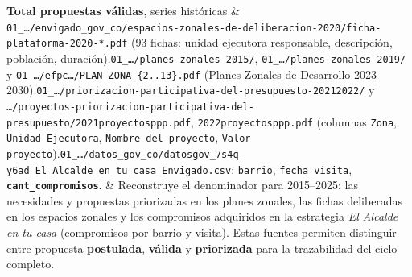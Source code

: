 \documentclass[11pt,a4paper]{article}
\begin{document}
{\begin{longtable}
\textbf{Total propuestas válidas}, series históricas & \texttt{01\_\allowbreak{}\ldots{}/\allowbreak{}envigado\_\allowbreak{}gov\_\allowbreak{}co/\allowbreak{}espacios-\allowbreak{}zonales-\allowbreak{}de-\allowbreak{}deliberacion-\allowbreak{}2020/\allowbreak{}ficha-\allowbreak{}plataforma-\allowbreak{}2020-\allowbreak{}*.\allowbreak{}pdf} (93 fichas: unidad ejecutora responsable, descripción, población, duración).\newline \texttt{01\_\allowbreak{}\ldots{}/\allowbreak{}planes-\allowbreak{}zonales-\allowbreak{}2015/\allowbreak{}}, \texttt{01\_\allowbreak{}\ldots{}/\allowbreak{}planes-\allowbreak{}zonales-\allowbreak{}2019/\allowbreak{}} y \texttt{01\_\allowbreak{}\ldots{}/\allowbreak{}efpc\ldots{}/\allowbreak{}PLAN-\allowbreak{}ZONA-\allowbreak{}\{2.\allowbreak{}.\allowbreak{}13\}.\allowbreak{}pdf} (Planes Zonales de Desarrollo 2023-2030).\newline \texttt{01\_\allowbreak{}\ldots{}/\allowbreak{}priorizacion-\allowbreak{}participativa-\allowbreak{}del-\allowbreak{}presupuesto-\allowbreak{}20212022/\allowbreak{}} y \texttt{\ldots{}/\allowbreak{}proyectos-\allowbreak{}priorizacion-\allowbreak{}participativa-\allowbreak{}del-\allowbreak{}presupuesto/\allowbreak{}2021proyectosppp.\allowbreak{}pdf}, \texttt{2022proyectosppp.\allowbreak{}pdf} (columnas \texttt{Zona}, \texttt{Unidad Ejecutora}, \texttt{Nombre del proyecto}, \texttt{Valor proyecto}).\newline \texttt{01\_\allowbreak{}\ldots{}/\allowbreak{}datos\_\allowbreak{}gov\_\allowbreak{}co/\allowbreak{}datosgov\_\allowbreak{}7s4q-\allowbreak{}y6ad\_\allowbreak{}El\_\allowbreak{}Alcalde\_\allowbreak{}en\_\allowbreak{}tu\_\allowbreak{}casa\_\allowbreak{}Envigado.\allowbreak{}csv}: \texttt{barrio}, \texttt{fecha\_\allowbreak{}visita}, \textbf{\texttt{cant\_\allowbreak{}compromisos}}. & Reconstruye el denominador para 2015–2025: las necesidades y propuestas priorizadas en los planes zonales, las fichas deliberadas en los espacios zonales y los compromisos adquiridos en la estrategia \emph{El Alcalde en tu casa} (compromisos por barrio y visita). Estas fuentes permiten distinguir entre propuesta \textbf{postulada}, \textbf{válida} y \textbf{priorizada} para la trazabilidad del ciclo completo. \\

\end{longtable}}
\end{document}
